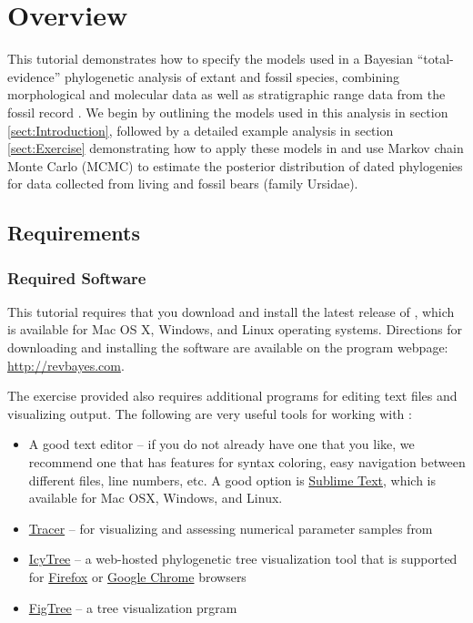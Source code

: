 
\section{Overview}\label{sect:Overview}

This tutorial demonstrates how to specify the models used in a Bayesian ``total-evidence'' phylogenetic analysis of extant and fossil species, combining morphological and molecular data as well as stratigraphic range data from the fossil record \citep[\EG][]{Ronquist2012a,Zhang2016,Gavryushkina2016}.
We begin by outlining the models used in this analysis in section \ref{sect:Introduction}, followed by a detailed example analysis in section \ref{sect:Exercise} demonstrating how to apply these models in \RevBayes \citep{Hoehna2017a} and use Markov chain Monte Carlo (MCMC) to estimate the posterior distribution of dated phylogenies for data collected from living and fossil bears (family Ursidae).

\bigskip
\subsection{Requirements}\label{subsect:Overview-Requirements}

\subsubsection{Required Software}\label{subsub:Req-Software}
This tutorial requires that you download and install the latest release of \RevBayes \citep{Hoehna2017a}, which is available for Mac OS X, Windows, and Linux operating systems. 
Directions for downloading and installing the software are available on the program webpage:
\href{http://revbayes.com/}{http://revbayes.com}.

The exercise provided also requires additional programs for editing text files and visualizing output. 
The following are very useful tools for working with \RevBayes:
\begin{itemize}[noitemsep,topsep=0pt]
\item A good text editor -- if you do not already have one that you like, we recommend one that has features for syntax coloring, easy navigation between different files, line numbers, etc.
A good option is \href{http://www.sublimetext.com/}{Sublime Text}, which is available for Mac OSX, Windows, and Linux.
\item \href{http://tree.bio.ed.ac.uk/software/tracer/}{Tracer} -- for visualizing and assessing numerical parameter samples from \RevBayes
\item \href{http://tgvaughan.github.io/icytree/}{IcyTree} -- a web-hosted phylogenetic tree visualization tool that is supported for \href{https://www.mozilla.org/en-US/firefox/products/}{Firefox} or \href{https://www.google.com/chrome/}{Google Chrome} browsers 
\item \href{http://tree.bio.ed.ac.uk/software/figtree/}{FigTree} -- a tree visualization prgram
\end{itemize}

